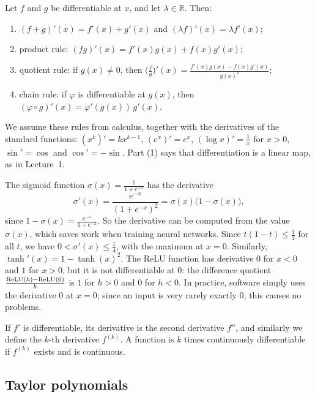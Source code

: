 \begin{proposition}\label{L3-prop:rules-1d}
    Let $f$ and $g$ be differentiable at $x$, and let $\lambda \in \mathbb{R}$. Then:
    \begin{enumerate}
        \item $(f + g)'(x) = f'(x) + g'(x)$ and $(\lambda f)'(x) = \lambda f'(x)$;
        \item product rule: $(fg)'(x) = f'(x) g(x) + f(x) g'(x)$;
        \item quotient rule: if $g(x) \neq 0$, then $\big(\frac{f}{g}\big)'(x) = \frac{f'(x) g(x) - f(x) g'(x)}{g(x)^2}$;
        \item chain rule: if $\varphi$ is differentiable at $g(x)$, then $(\varphi \circ g)'(x) = \varphi'(g(x))\, g'(x)$.
    \end{enumerate}
\end{proposition}

We assume these rules from calculus, together with the derivatives of the standard functions: $(x^k)' = k x^{k-1}$, $(e^x)' = e^x$, $(\log x)' = \frac{1}{x}$ for $x > 0$, $\sin' = \cos$ and $\cos' = -\sin$. Part (1) says that differentiation is a linear map, as in Lecture~1.

\begin{example}\label{L3-ex:sigmoid}
    The sigmoid function $\sigma(x) = \frac{1}{1 + e^{-x}}$ has the derivative
    \[\sigma'(x) = \frac{e^{-x}}{(1 + e^{-x})^2} = \sigma(x) \big(1 - \sigma(x)\big),\]
    since $1 - \sigma(x) = \frac{e^{-x}}{1 + e^{-x}}$. So the derivative can be computed from the value $\sigma(x)$, which saves work when training neural networks. Since $t(1 - t) \leq \frac{1}{4}$ for all $t$, we have $0 < \sigma'(x) \leq \frac{1}{4}$, with the maximum at $x = 0$. Similarly, $\tanh'(x) = 1 - \tanh(x)^2$. The ReLU function has derivative $0$ for $x < 0$ and $1$ for $x > 0$, but it is not differentiable at $0$: the difference quotient $\frac{\operatorname{ReLU}(h) - \operatorname{ReLU}(0)}{h}$ is $1$ for $h > 0$ and $0$ for $h < 0$. In practice, software simply uses the derivative $0$ at $x = 0$; since an input is very rarely exactly $0$, this causes no problems.
\end{example}

If $f'$ is differentiable, its derivative is the second derivative $f''$, and similarly we define the $k$-th derivative $f^{(k)}$. A function is $k$ times continuously differentiable if $f^{(k)}$ exists and is continuous.

\subsection{Taylor polynomials}

